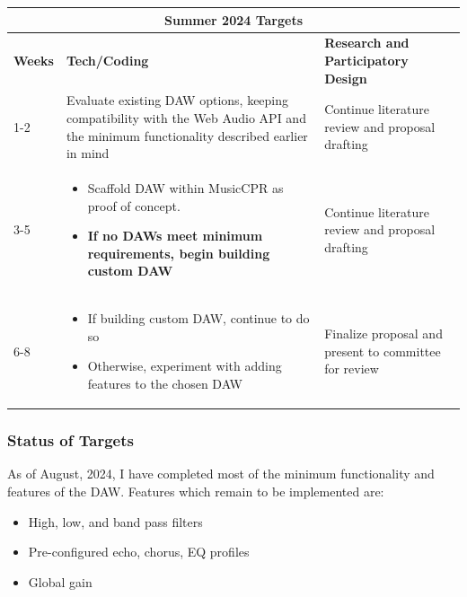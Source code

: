 \documentclass[manuscript,screen,review]{acmart}
\begin{document}
\begin{center}
    \begin{tabular}{ |p{1cm}||p{6.5cm}|p{6.5cm}| }
    \hline
    \multicolumn{3}{|c|}{\textbf{Summer 2024 Targets}} \\
    \hline
           \textbf{Weeks}
         & \textbf{Tech/Coding}
         & \textbf{Research and Participatory Design} \\
    \hline
            1-2
         &  
             \item Evaluate existing DAW options, keeping compatibility with the Web Audio API and the minimum functionality described earlier in mind
         & 
             \item Continue literature review and proposal drafting
         \\
    \hline
            3-5
         &  
         \begin{itemize}[leftmargin=*]
             \item Scaffold DAW within MusicCPR as proof of concept.
             \item \textbf{If no DAWs meet minimum requirements, begin building custom DAW}
         \end{itemize}
         &
             \item Continue literature review and proposal drafting
         \\
    \hline
            6-8
         &
         \begin{itemize}[leftmargin=*]
             \item If building custom DAW, continue to do so
             \item Otherwise, experiment with adding features to the chosen DAW
         \end{itemize}
        & 
            \item Finalize proposal and present to committee for review
         \\
    \hline
    \end{tabular}
\end{center}

\subsubsection{Status of Targets}
As of August, 2024, I have completed most of the minimum functionality and features of the DAW.
Features which remain to be implemented are:
\begin{itemize}
    \item High, low, and band pass filters
    \item Pre-configured echo, chorus, EQ profiles
    \item Global gain
\end{itemize}
\end{document}
